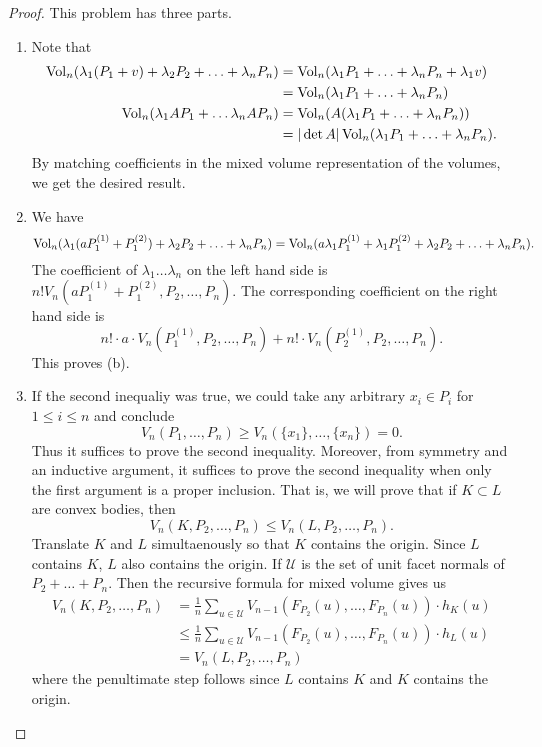 \documentclass[12pt]{article}
\begin{document}
\begin{proof}
	This problem has three parts. 
	\begin{enumerate}[label = (\alph*)]
		\item Note that 
		\begin{align*}
			\operatorname{Vol}_n(\lambda_1(P_1 + v) + \lambda_2 P_2 + \ldots + \lambda_n P_n) & = \operatorname{Vol}_n (\lambda_1 P_1 + \ldots + \lambda_n P_n + \lambda_1 v) \\
			& = \operatorname{Vol}_n(\lambda_1 P_1 + \ldots + \lambda_n P_n) \\
			\operatorname{Vol}_n(\lambda_1 A P_1 + \ldots \lambda_n A P_n) & = \operatorname{Vol}_n (A(\lambda_1 P_1 + \ldots + \lambda_n P_n)) \\
			& = |\det A| \operatorname{Vol}_n(\lambda_1 P_1 + \ldots + \lambda_n P_n). 
		\end{align*}
		By matching coefficients in the mixed volume representation of the volumes, we get the desired result. 

		\item We have 
		\[
			\operatorname{Vol}_n(\lambda_1(a P_1^{(1)} + P_1^{(2)}) + \lambda_2 P_2 + \ldots + \lambda_n P_n) = \operatorname{Vol}_n(a \lambda_1 P_1^{(1)} + \lambda_1 P_1^{(2)} + \lambda_2 P_2 + \ldots + \lambda_n P_n).
		\]
		The coefficient of $\lambda_1 \ldots \lambda_n$ on the left hand side is $n! V_n(aP_1^{(1)} + P_1^{(2)}, P_2, \ldots, P_n)$. The corresponding coefficient on the right hand side is 
		\[
			n! \cdot a \cdot V_n(P_1^{(1)}, P_2, \ldots, P_n) + n! \cdot V_n(P_2^{(1)}, P_2, \ldots, P_n). 
		\]
		This proves (b). 

		\item If the second inequaliy was true, we could take any arbitrary $x_i \in P_i$ for $1 \leq i \leq n$ and conclude
		\[
			V_n(P_1, \ldots, P_n) \geq V_n(\{x_1\}, \ldots, \{x_n\}) = 0.
		\]
		Thus it suffices to prove the second inequality. Moreover, from symmetry and an inductive argument, it suffices to prove the second inequality when only the first argument is a proper inclusion. That is, we will prove that if $K \subset L$ are convex bodies, then 
		\[
			V_n(K, P_2, \ldots, P_n) \leq V_n(L, P_2, \ldots, P_n). 
		\]
		Translate $K$ and $L$ simultaenously so that $K$ contains the origin. Since $L$ contains $K$, $L$ also contains the origin. If $\mathcal{U}$ is the set of unit facet normals of $P_2 + \ldots + P_n$. Then the recursive formula for mixed volume gives us 
		\begin{align*}
			V_n(K, P_2, \ldots, P_n) & = \frac{1}{n} \sum_{u \in \mathcal{U}} V_{n-1}(F_{P_2}(u), \ldots, F_{P_n} (u)) \cdot h_K(u) \\
			& \leq \frac{1}{n} \sum_{u \in \mathcal{U}}  V_{n-1} (F_{P_2}(u), \ldots, F_{P_n}(u)) \cdot h_L(u) \\ 
			& = V_n(L, P_2, \ldots, P_n)
		\end{align*}
		where the penultimate step follows since $L$ contains $K$ and $K$ contains the origin. 
	\end{enumerate}
\end{proof}
\end{document}
